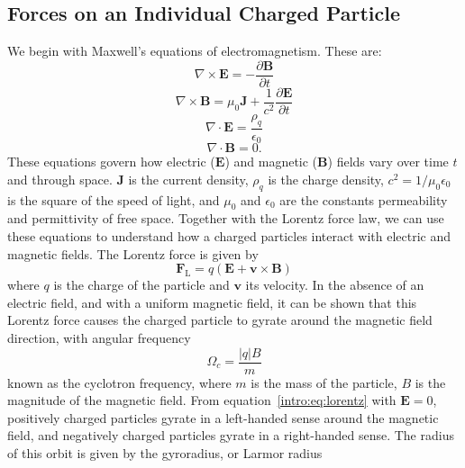 \subsection{Forces on an Individual Charged Particle}\label{intro:sec:singleparticle}
We begin with Maxwell's equations of electromagnetism. These are:
\begin{equation}
\nabla \times \boldsymbol{E} = -\frac{\partial \boldsymbol{B}}{\partial t}
\end{equation}
\begin{equation}\label{intro:eq:amperemaxwell}
\nabla \times \boldsymbol{B} = \mu_0 \boldsymbol{J} + \frac{1}{c^2}\frac{\partial \boldsymbol{E}}{\partial t}
\end{equation}
\begin{equation}
\nabla \cdot \boldsymbol{E} = \frac{\rho_q}{\epsilon_0} 
\end{equation}
\begin{equation}
\nabla \cdot \boldsymbol{B} = 0.
\end{equation}
These equations govern how electric ($\boldsymbol{E}$) and magnetic ($\boldsymbol{B}$) fields vary over time $t$ and through space. $\boldsymbol{J}$ is the current density, $\rho_q$ is the charge density, $c^2 = 1/\mu_0 \epsilon_0$ is the square of the speed of light, and $\mu_0$ and $\epsilon_0$ are the constants permeability and permittivity of free space. Together with the Lorentz force law, we can use these equations to understand how a charged particles interact with electric and magnetic fields. The Lorentz force is given by 
\begin{equation}\label{intro:eq:lorentz}
\boldsymbol{F}_\mathrm{L} = q(\boldsymbol{E} + \boldsymbol{v} \times \boldsymbol{B})
\end{equation}
where $q$ is the charge of the particle and $\boldsymbol{v}$ its velocity. In the absence of an electric field, and with a uniform magnetic field, it can be shown that this Lorentz force causes the charged particle to gyrate around the magnetic field direction, with angular frequency
\begin{equation}
\Omega_c = \frac{|q|B}{m}
\end{equation}
known as the cyclotron frequency, where $m$ is the mass of the particle, $B$ is the magnitude of the magnetic field. From equation~\ref{intro:eq:lorentz}  with $\boldsymbol{E}=0$, positively charged particles gyrate in a left-handed sense around the magnetic field, and negatively charged particles gyrate in a right-handed sense. The radius of this orbit is given by the gyroradius, or Larmor radius
